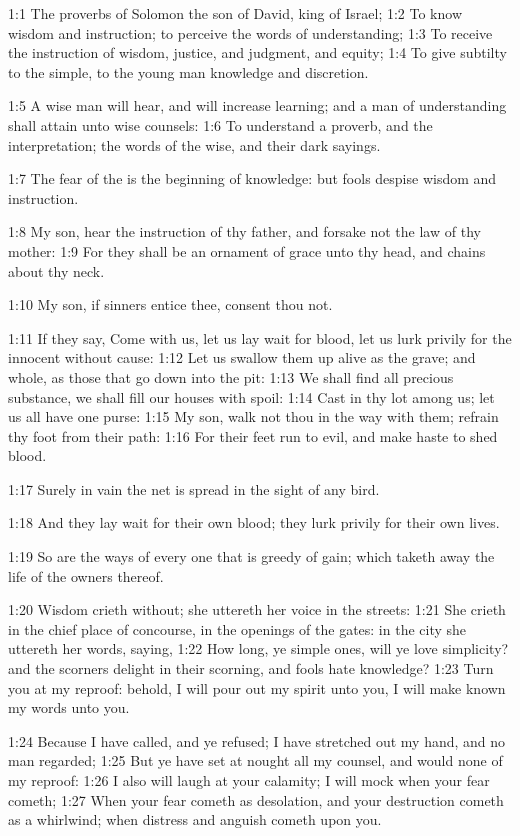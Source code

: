 

1:1 The proverbs of Solomon the son of David, king of Israel; 1:2 To know wisdom and instruction; to perceive the words of understanding; 1:3 To receive the instruction of wisdom, justice, and judgment, and equity; 1:4 To give subtilty to the simple, to the young man knowledge and discretion.

1:5 A wise man will hear, and will increase learning; and a man of understanding shall attain unto wise counsels: 1:6 To understand a proverb, and the interpretation; the words of the wise, and their dark sayings.

1:7 The fear of the \LORD is the beginning of knowledge: but fools despise wisdom and instruction.

1:8 My son, hear the instruction of thy father, and forsake not the law of thy mother: 1:9 For they shall be an ornament of grace unto thy head, and chains about thy neck.

1:10 My son, if sinners entice thee, consent thou not.

1:11 If they say, Come with us, let us lay wait for blood, let us lurk privily for the innocent without cause: 1:12 Let us swallow them up alive as the grave; and whole, as those that go down into the pit: 1:13 We shall find all precious substance, we shall fill our houses with spoil: 1:14 Cast in thy lot among us; let us all have one purse: 1:15 My son, walk not thou in the way with them; refrain thy foot from their path: 1:16 For their feet run to evil, and make haste to shed blood.

1:17 Surely in vain the net is spread in the sight of any bird.

1:18 And they lay wait for their own blood; they lurk privily for their own lives.

1:19 So are the ways of every one that is greedy of gain; which taketh away the life of the owners thereof.

1:20 Wisdom crieth without; she uttereth her voice in the streets: 1:21 She crieth in the chief place of concourse, in the openings of the gates: in the city she uttereth her words, saying, 1:22 How long, ye simple ones, will ye love simplicity? and the scorners delight in their scorning, and fools hate knowledge?  1:23 Turn you at my reproof: behold, I will pour out my spirit unto you, I will make known my words unto you.

1:24 Because I have called, and ye refused; I have stretched out my hand, and no man regarded; 1:25 But ye have set at nought all my counsel, and would none of my reproof: 1:26 I also will laugh at your calamity; I will mock when your fear cometh; 1:27 When your fear cometh as desolation, and your destruction cometh as a whirlwind; when distress and anguish cometh upon you.

